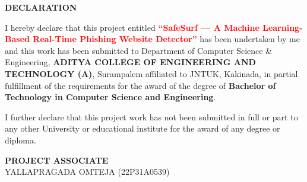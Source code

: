 \begin{center}
{\bfseries\fontsize{16}{18}\selectfont DECLARATION}
\end{center}

\vspace{0.5cm}
\noindent
I hereby declare that this project entitled
\textbf{\textcolor{red}{``SafeSurf — A Machine Learning-Based Real-Time Phishing Website Detector''}}
has been undertaken by me and this work has been submitted to Department of Computer Science \& Engineering,
\textbf{ADITYA \newline COLLEGE OF ENGINEERING AND TECHNOLOGY (A)}, Surampalem affiliated to JNTUK, Kakinada,
in partial fulfillment of the requirements for the award of the degree of
\textbf{Bachelor of Technology in Computer Science and Engineering}.

\vspace{0.5cm}

\noindent
I further declare that this project work has not been submitted in full or part to any other University
or educational institute for the award of any degree or diploma.

\vspace{2cm}

\begin{flushright}
\textbf{PROJECT ASSOCIATE}\\[0.5cm]

YALLAPRAGADA OMTEJA (22P31A0539)
\end{flushright}